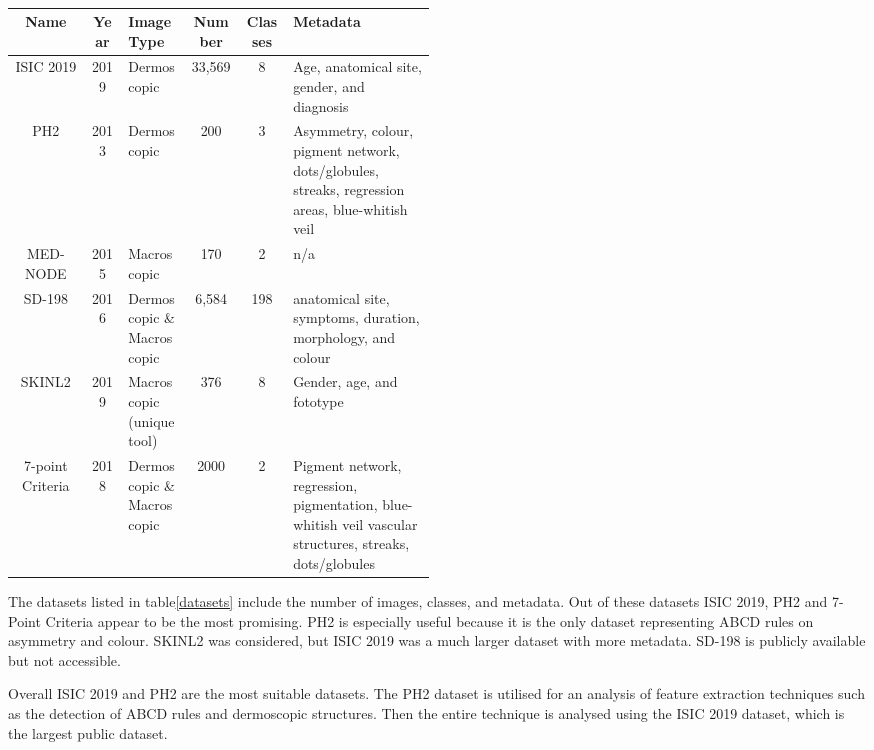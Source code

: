 \begin{table}
	\small
	\begin{tabular}{|c|c|p{0.15\linewidth}|c|c|p{0.34\linewidth}|}
		\hline
		Name             & Year & Image Type                 & Number & Classes & Metadata                                                                                                 \\
		\hline
		ISIC 2019        & 2019 & Dermoscopic                & 33,569 & 8       & Age, anatomical site, gender, and diagnosis
		\\
		\hline
		PH2              & 2013 & Dermoscopic                & 200    & 3       & Asymmetry, colour, pigment network, dots/globules, streaks, regression areas, blue-whitish veil
		\\
		\hline
		MED-NODE         & 2015 & Macroscopic                & 170    & 2       & n/a
		\\
		\hline
		SD-198           & 2016 & Dermoscopic \& Macroscopic & 6,584  & 198     & anatomical site, symptoms, duration, morphology, and colour
		\\
		\hline
		SKINL2           & 2019 & Macroscopic (unique tool)  & 376    & 8       & Gender, age, and fototype
		\\
		\hline
		7-point Criteria & 2018 & Dermoscopic \& Macroscopic & 2000   & 2       & Pigment network, regression, pigmentation, blue-whitish veil vascular structures, streaks, dots/globules
		\\
		\hline
	\end{tabular}
	\caption{}
\end{table}\label{datasets}

The datasets listed in table\ref{datasets} include the number of images, classes, and metadata. Out of these datasets ISIC 2019, PH2 and 7-Point Criteria appear to be the most promising. PH2 is especially useful because it is the only dataset representing ABCD rules on asymmetry and colour. SKINL2 was considered, but ISIC 2019 was a much larger dataset with more metadata. SD-198 is publicly available but not accessible.

Overall ISIC 2019 and PH2 are the most suitable datasets. The PH2 dataset is utilised for an analysis of feature extraction techniques such as the detection of ABCD rules and dermoscopic structures. Then the entire technique is analysed using the ISIC 2019 dataset, which is the largest public dataset.

